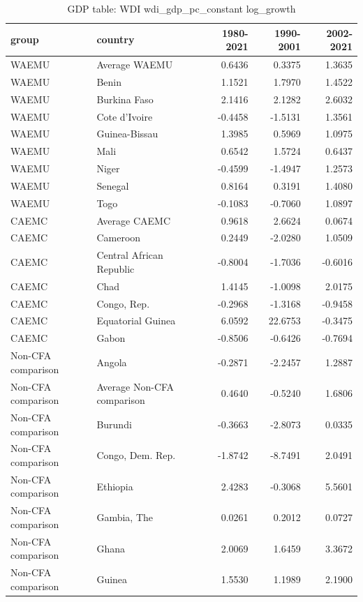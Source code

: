 \begin{table}

\caption{GDP table: WDI wdi_gdp_pc_constant log_growth}
\centering
\begin{tabular}[t]{llrrr}
\toprule
group & country & 1980-2021 & 1990-2001 & 2002-2021\\
\midrule
WAEMU & Average WAEMU & 0.6436 & 0.3375 & 1.3635\\
WAEMU & Benin & 1.1521 & 1.7970 & 1.4522\\
WAEMU & Burkina Faso & 2.1416 & 2.1282 & 2.6032\\
WAEMU & Cote d'Ivoire & -0.4458 & -1.5131 & 1.3561\\
WAEMU & Guinea-Bissau & 1.3985 & 0.5969 & 1.0975\\
\addlinespace
WAEMU & Mali & 0.6542 & 1.5724 & 0.6437\\
WAEMU & Niger & -0.4599 & -1.4947 & 1.2573\\
WAEMU & Senegal & 0.8164 & 0.3191 & 1.4080\\
WAEMU & Togo & -0.1083 & -0.7060 & 1.0897\\
CAEMC & Average CAEMC & 0.9618 & 2.6624 & 0.0674\\
\addlinespace
CAEMC & Cameroon & 0.2449 & -2.0280 & 1.0509\\
CAEMC & Central African Republic & -0.8004 & -1.7036 & -0.6016\\
CAEMC & Chad & 1.4145 & -1.0098 & 2.0175\\
CAEMC & Congo, Rep. & -0.2968 & -1.3168 & -0.9458\\
CAEMC & Equatorial Guinea & 6.0592 & 22.6753 & -0.3475\\
\addlinespace
CAEMC & Gabon & -0.8506 & -0.6426 & -0.7694\\
Non-CFA comparison & Angola & -0.2871 & -2.2457 & 1.2887\\
Non-CFA comparison & Average Non-CFA comparison & 0.4640 & -0.5240 & 1.6806\\
Non-CFA comparison & Burundi & -0.3663 & -2.8073 & 0.0335\\
Non-CFA comparison & Congo, Dem. Rep. & -1.8742 & -8.7491 & 2.0491\\
\addlinespace
Non-CFA comparison & Ethiopia & 2.4283 & -0.3068 & 5.5601\\
Non-CFA comparison & Gambia, The & 0.0261 & 0.2012 & 0.0727\\
Non-CFA comparison & Ghana & 2.0069 & 1.6459 & 3.3672\\
Non-CFA comparison & Guinea & 1.5530 & 1.1989 & 2.1900\\

\end{tabular}
\end{table}
